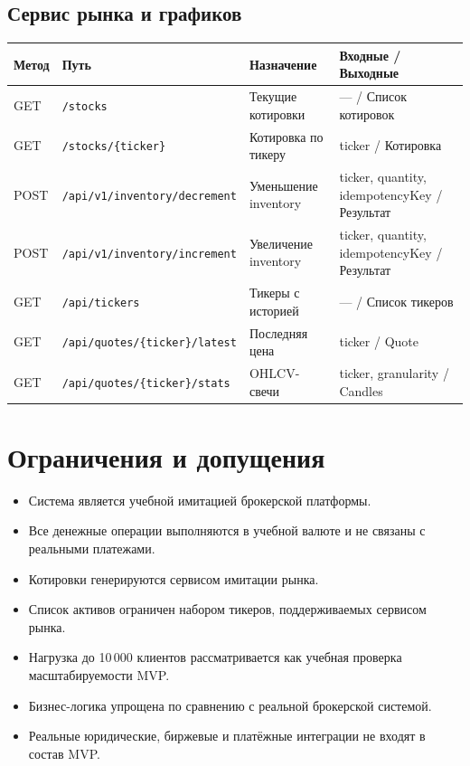 \documentclass[12pt,a4paper]{article}
\begin{document}
\subsection{Сервис рынка и графиков}

\begin{longtable}{p{1.5cm}p{5cm}p{3cm}p{5cm}}
\toprule
\textbf{Метод} & \textbf{Путь} & \textbf{Назначение} & \textbf{Входные / Выходные} \\
\midrule
\endhead
GET & \texttt{/stocks} & Текущие котировки & --- / Список котировок \\
GET & \texttt{/stocks/\{ticker\}} & Котировка по тикеру & ticker / Котировка \\
POST & \texttt{/api/v1/inventory/decrement} & Уменьшение inventory & ticker, quantity, idempotencyKey / Результат \\
POST & \texttt{/api/v1/inventory/increment} & Увеличение inventory & ticker, quantity, idempotencyKey / Результат \\
GET & \texttt{/api/tickers} & Тикеры с историей & --- / Список тикеров \\
GET & \texttt{/api/quotes/\{ticker\}/latest} & Последняя цена & ticker / Quote \\
GET & \texttt{/api/quotes/\{ticker\}/stats} & OHLCV-свечи & ticker, granularity / Candles \\
\bottomrule
\end{longtable}

\section{Ограничения и допущения}

\begin{itemize}
    \item Система является учебной имитацией брокерской платформы.
    \item Все денежные операции выполняются в учебной валюте и не связаны с реальными платежами.
    \item Котировки генерируются сервисом имитации рынка.
    \item Список активов ограничен набором тикеров, поддерживаемых сервисом рынка.
    \item Нагрузка до 10\,000 клиентов рассматривается как учебная проверка масштабируемости MVP.
    \item Бизнес-логика упрощена по сравнению с реальной брокерской системой.
    \item Реальные юридические, биржевые и платёжные интеграции не входят в состав MVP.
\end{itemize}
\end{document}
